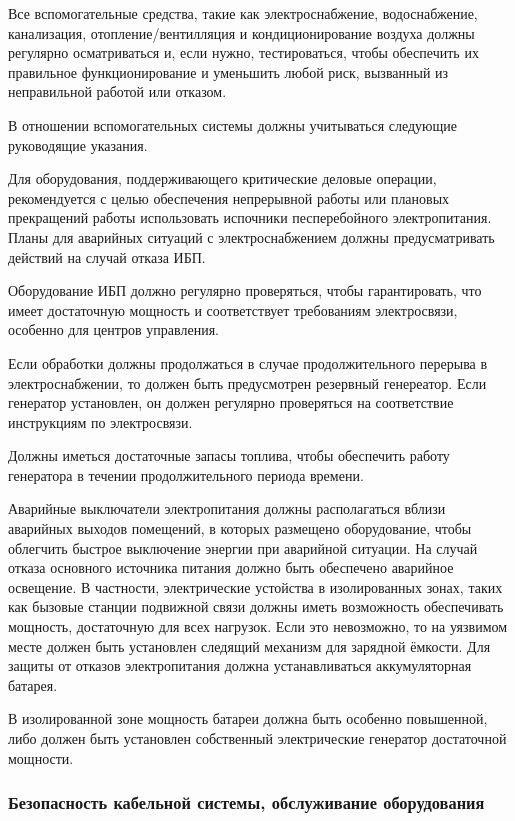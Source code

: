 \documentclass[12pt, russian, oneside, article]{ncc}
\begin{document}
Все вспомогательные средства, такие как электроснабжение, водоснабжение, канализация, отопление/вентилляция и кондиционирование воздуха должны регулярно осматриваться и, если нужно, тестироваться, чтобы обеспечить их правильное функционирование и уменьшить любой риск, вызванный из неправильной работой или отказом.

В отношении вспомогательных системы должны учитываться следующие руководящие указания.

Для оборудования, поддерживающего критические деловые операции, рекомендуется с целью обеспечения непрерывной работы или плановых прекращений работы использовать испочники песперебойного электропитания. Планы для аварийных ситуаций с электроснабжением должны предусматривать действий на случай отказа ИБП.

Оборудование ИБП должно регулярно проверяться, чтобы гарантировать, что имеет достаточную мощность и соответствует требованиям электросвязи, особенно для центров управления.

Если обработки должны продолжаться в случае продолжительного перерыва в электроснабжении, то должен быть предусмотрен резервный генереатор. Если генератор установлен, он должен регулярно проверяться на соответствие инструкциям по электросвязи.

Должны иметься достаточные запасы топлива, чтобы обеспечить работу генератора в течении продолжительного периода времени.

Аварийные выключатели электропитания должны располагаться вблизи аварийных выходов помещений, в которых размещено оборудование, чтобы облегчить быстрое выключение энергии при аварийной ситуации. На случай отказа основного источника питания должно быть обеспечено аварийное освещение. В частности, электрические устойства в изолированных зонах, таких как бызовые станции подвижной связи должны иметь возможность обеспечивать мощность, достаточную для всех нагрузок. Если это невозможно, то на уязвимом месте должен быть установлен следящий механизм для зарядной ёмкости. Для защиты от отказов электропитания должна устанавливаться аккумуляторная батарея.

В изолированной зоне мощность батареи должна быть особенно повышенной, либо должен быть установлен собственный электрические генератор достаточной мощности.
\subsubsection{Безопасность кабельной системы, обслуживание оборудования}
\label{sec-5_5_5}
\end{document}
